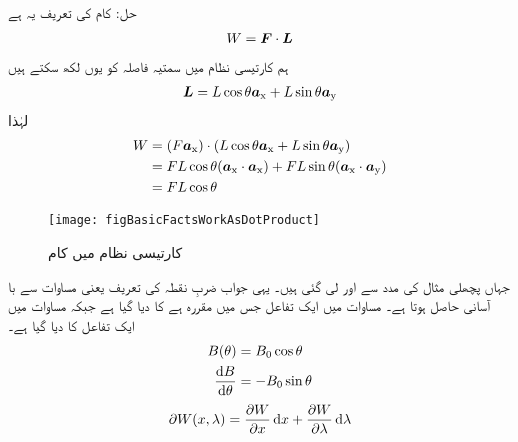 	حل:
	کام   کی تعریف یہ ہے
\begin{align}
W={{\boldsymbol{F}}} \cdot {\ensuremath{{\boldsymbol{L}}}}
\end{align}
ہم کارتیسی نظام میں سمتیہ فاصلہ کو یوں لکھ سکتے ہیں
\begin{align}
{\ensuremath{{\boldsymbol{L}}}}=L \cos \theta {\boldsymbol{a}}_{\textup{x}} +L \sin \theta {\boldsymbol{a}}_{\textup{y}}
\end{align}
لہٰذا
\begin{gather}
\begin{aligned}
W &= (F {\boldsymbol{a}}_{\textup{x}}) \cdot (L \cos \theta {\boldsymbol{a}}_{\textup{x}} +L \sin \theta {\boldsymbol{a}}_{\textup{y}})\\
&=F L \cos \theta ({\boldsymbol{a}}_{\textup{x}} \cdot {\boldsymbol{a}}_{\textup{x}})+ F L \sin \theta ({\boldsymbol{a}}_{\textup{x}} \cdot {\boldsymbol{a}}_{\textup{y}})\\
&= F L \cos \theta
\end{aligned}
\end{gather}
%
\begin{figure}
\centering
\texttt{[image: figBasicFactsWorkAsDotProduct]}
\caption{کارتیسی نظام میں کام}
\label{شکل_حقائق_کارتیسی_کام}
\end{figure}
جہاں پچھلی مثال کی مدد سے  اور  لی گئی ہیں۔ یہی جواب ضربِ نقطہ کی تعریف یعنی مساوات  سے با آسانی حاصل ہوتا ہے۔
%
مساوات  میں ایک تفاعل جس میں  مقررہ ہے کا  دیا گیا ہے جبکہ مساوات   میں ایک تفاعل کا   دیا گیا ہے۔
\begin{gather}
\begin{aligned}\label{مساوات_بنیادی_تفرق}
B (\theta )&=B_0 \cos \theta\\
\frac{\dif B}{\dif \theta}&=-B_0 \sin \theta
\end{aligned}
\end{gather} 
%
\begin{align}\label{مساوات_بنیادی_جزوی_تفرق}
\partial W(x,\lambda)=\frac{\partial W}{\partial x} \dif x+\frac{\partial W}{\partial \lambda} \dif \lambda
\end{align}

